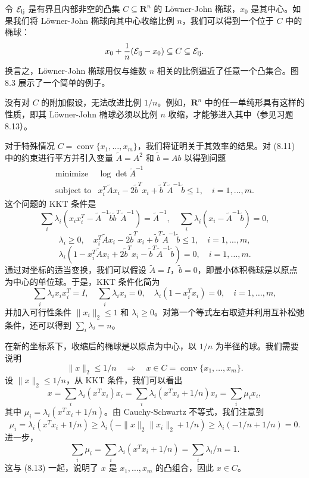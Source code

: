 \documentclass[UTF8, 12pt, fontset=fandol, oneside]{ctexart}
\begin{document}
令 $\mathcal{E}_{\rm lj}$ 是有界且内部非空的凸集 $C\subseteq\mathbf{R}^n$ 的 Löwner-John 椭球，$x_0$ 是其中心。如果我们将 Löwner-John 椭球向其中心收缩比例 $n$，我们可以得到一个位于 $C$ 中的椭球：
\[
x_0+\frac{1}{n}(\mathcal{E}_{\rm lj}-x_0)\subseteq C\subseteq \mathcal{E}_{\rm lj}.
\]
换言之，Löwner-John 椭球用仅与维数 $n$ 相关的比例逼近了任意一个凸集合。图 8.3 展示了一个简单的例子。

没有对 $C$ 的附加假设，无法改进比例 $1/n$。例如，$\mathbf{R}^n$ 中的任一单纯形具有这样的性质，即其 Löwner-John 椭球必须以比例 $n$ 收缩，才能够进入其中（参见习题 8.13）。

对于特殊情况 $C=\operatorname{conv}\{x_1,\ldots,x_m\}$，我们将证明关于其效率的结果。对 (8.11) 中的约束进行平方并引入变量 $\tilde{A}=A^2$ 和 $\tilde{b}=Ab$ 以得到问题
\[
\begin{array}{ll}
\mbox{minimize} & \log\det \tilde{A}^{-1}\\
\mbox{subject to} & x_i^T\tilde{A}x_i-2\tilde{b}^Tx_i+\tilde{b}^T\tilde{A}^{-1}\tilde{b}\leq 1,\quad i=1,\ldots,m.
\end{array}
\tag{8.12}
\]
这个问题的 KKT 条件是
\[
\sum_i \lambda_i(x_i x_i^T-\tilde{A}^{-1}\tilde{b}\tilde{b}^T\tilde{A}^{-1})=\tilde{A}^{-1},\quad
\sum_i \lambda_i(x_i-\tilde{A}^{-1}\tilde{b})=0,
\]
\[
\lambda_i\geq 0,\quad x_i^T\tilde{A}x_i-2\tilde{b}^Tx_i+\tilde{b}^T\tilde{A}^{-1}\tilde{b}\leq 1,\quad i=1,\ldots,m,
\]
\[
\lambda_i(1-x_i^T\tilde{A}x_i+2\tilde{b}^Tx_i-\tilde{b}^T\tilde{A}^{-1}\tilde{b})=0,\quad i=1,\ldots,m.
\]
通过对坐标的适当变换，我们可以假设 $\tilde{A}=I$，$\tilde{b}=0$，即最小体积椭球是以原点为中心的单位球。于是，KKT 条件化简为
\[
\sum_i \lambda_i x_i x_i^T=I,\quad
\sum_i \lambda_i x_i=0,\quad
\lambda_i(1-x_i^Tx_i)=0,\quad i=1,\ldots,m,
\]
并加入可行性条件 $\|x_i\|_2\leq 1$ 和 $\lambda_i\geq 0$。对第一个等式左右取迹并利用互补松弛条件，还可以得到 $\sum_i\lambda_i=n$。

在新的坐标系下，收缩后的椭球是以原点为中心，以 $1/n$ 为半径的球。我们需要说明
\[
\|x\|_2\leq 1/n\quad\Longrightarrow\quad x\in C=\operatorname{conv}\{x_1,\ldots,x_m\}.
\]
设 $\|x\|_2\leq 1/n$，从 KKT 条件，我们可以看出
\[
x=\sum_i \lambda_i(x^Tx_i)x_i
=\sum_i \lambda_i(x^Tx_i+1/n)x_i
=\sum_i \mu_i x_i,
\tag{8.13}
\]
其中 $\mu_i=\lambda_i(x^Tx_i+1/n)$。由 Cauchy-Schwartz 不等式，我们注意到
\[
\mu_i=\lambda_i(x^Tx_i+1/n)\geq
\lambda_i(-\|x\|_2\|x_i\|_2+1/n)\geq
\lambda_i(-1/n+1/n)=0.
\]
进一步，
\[
\sum_i \mu_i=\sum_i\lambda_i(x^Tx_i+1/n)=\sum_i\lambda_i/n=1.
\]
这与 (8.13) 一起，说明了 $x$ 是 $x_1,\ldots,x_m$ 的凸组合，因此 $x\in C$。
\end{document}
